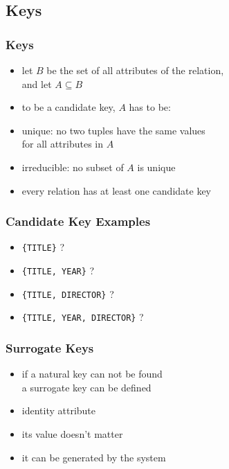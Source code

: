 \documentclass[dvipsnames]{beamer}
\theoremstyle{plain}
\begin{document}
\subsection{Keys}

\begin{frame}
  \frametitle{Keys}

  \begin{itemize}
    \item let $B$ be the set of all attributes of the relation,\\
      and let $A \subseteq B$

    \pause
    \bigskip
    \item to be a candidate key, $A$ has to be:
    \smallskip
    \item \alert{unique}: no two tuples have the same values\\
      for all attributes in $A$
    \item \alert{irreducible}: no subset of $A$ is unique

    \pause
    \bigskip
    \item every relation has at least one candidate key
  \end{itemize}
\end{frame}

\begin{frame}
  \frametitle{Candidate Key Examples}

  \begin{itemize}
    \item \texttt{\{TITLE\}} ?

    \pause
    \item \texttt{\{TITLE, YEAR\}} ?

    \pause
    \item \texttt{\{TITLE, DIRECTOR\}} ?

    \pause
    \item \texttt{\{TITLE, YEAR, DIRECTOR\}} ?
  \end{itemize}
\end{frame}

\begin{frame}
  \frametitle{Surrogate Keys}

  \begin{itemize}
    \item if a \alert{natural key} can not be found\\
      a \alert{surrogate key} can be defined

    \pause
    \medskip
    \item identity attribute
    \item its value doesn't matter
    \item it can be generated by the system
  \end{itemize}
\end{frame}
\end{document}

